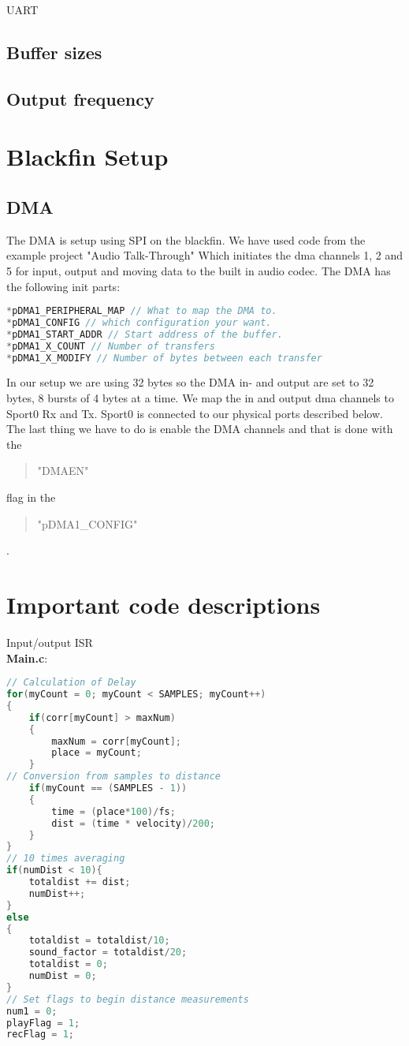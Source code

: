 UART\\
\subsection{Buffer sizes}

\subsection{Output frequency}
\section{Blackfin Setup}
\subsection{DMA}
The DMA is setup using SPI on the blackfin. We have used code from the example project "Audio Talk-Through" Which initiates the dma channels 1, 2 and 5 for input, output and moving data to the built in audio codec. The DMA has the following init parts:
\begin{lstlisting}[language=C]
*pDMA1_PERIPHERAL_MAP // What to map the DMA to.
*pDMA1_CONFIG // which configuration your want.
*pDMA1_START_ADDR // Start address of the buffer.
*pDMA1_X_COUNT // Number of transfers
*pDMA1_X_MODIFY // Number of bytes between each transfer
\end{lstlisting}
In our setup we are using 32 bytes so the DMA in- and output are set to 32 bytes, 8 bursts of 4 bytes at a time. We map the in and output dma channels to Sport0 Rx and Tx. Sport0 is connected to our physical ports described below. The last thing we have to do is enable the DMA channels and that is done with the \begin{quote}
"DMAEN"
\end{quote}  flag in the 
\begin{quote}
"pDMA1\_CONFIG"
\end{quote}
.\\
\section{Important code descriptions}
Input/output ISR\\
\textbf{Main.c}:\\
\begin{lstlisting}[language=C]
// Calculation of Delay
for(myCount = 0; myCount < SAMPLES; myCount++)
{
	if(corr[myCount] > maxNum)
	{
		maxNum = corr[myCount];
		place = myCount;	
	}
// Conversion from samples to distance
	if(myCount == (SAMPLES - 1))
	{
		time = (place*100)/fs;
		dist = (time * velocity)/200;
	}
}
// 10 times averaging
if(numDist < 10){
	totaldist += dist;
	numDist++;
}
else
{
	totaldist = totaldist/10;
	sound_factor = totaldist/20;
	totaldist = 0;
	numDist = 0;
}
// Set flags to begin distance measurements
num1 = 0;
playFlag = 1;
recFlag = 1;
\end{lstlisting}


